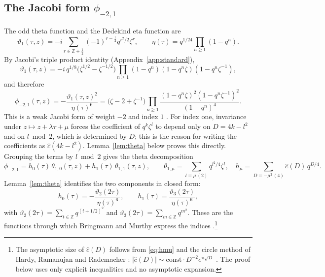 \documentclass[11pt]{amsart}
\theoremstyle{definition}
\newcommand{\ZZ}{\mathbb{Z}}
\newcommand{\cc}{\hat c}
\newcommand{\vt}{\vartheta}
\begin{document}
\subsection{The Jacobi form $\phi_{-2,1}$}\label{ssec:jacobi}
The odd theta function and the Dedekind eta function are
\[
\vt_1(\tau,z)=-i\sum_{r\in\ZZ+\frac12}(-1)^{r-\frac12}q^{r^2/2}\zeta^r,\qquad \eta(\tau)=q^{1/24}\prod_{n\ge1}(1-q^n).
\]
By Jacobi's triple product identity (Appendix~\ref{app:standard}),
\begin{equation}\label{eq:triple}
\vt_1(\tau,z)=-i\,q^{1/8}\bigl(\zeta^{1/2}-\zeta^{-1/2}\bigr)\prod_{n\ge1}(1-q^n)(1-q^n\zeta)(1-q^n\zeta^{-1}),
\end{equation}
and therefore
\begin{equation}\label{eq:product}
\phi_{-2,1}(\tau,z)=-\frac{\vt_1(\tau,z)^2}{\eta(\tau)^6}=\bigl(\zeta-2+\zeta^{-1}\bigr)\prod_{n\ge1}\frac{(1-q^n\zeta)^2(1-q^n\zeta^{-1})^2}{(1-q^n)^4}.
\end{equation}
This is a weak Jacobi form of weight $-2$ and index $1$ \cite[Thm.~9.3]{EZ85}. For index one, invariance under $z\mapsto z+\lambda\tau+\mu$ forces the coefficient of $q^k\zeta^l$ to depend only on $D=4k-l^2$ and on $l\bmod 2$, which is determined by $D$; this is the reason for writing the coefficients as $\cc(4k-l^2)$. Lemma~\ref{lem:theta} below proves this directly. Grouping the terms by $l\bmod2$ gives the theta decomposition
\[
\phi_{-2,1}=h_0(\tau)\,\theta_{1,0}(\tau,z)+h_1(\tau)\,\theta_{1,1}(\tau,z),\qquad \theta_{1,\mu}=\sum_{l\equiv\mu\,(2)}q^{l^2/4}\zeta^l,\quad h_\mu=\sum_{D\equiv-\mu^2\,(4)}\cc(D)\,q^{D/4}.
\]
Lemma~\ref{lem:theta} identifies the two components in closed form:
\begin{equation}\label{eq:hmu}
h_0(\tau)=-\frac{\vt_2(2\tau)}{\eta(\tau)^6},\qquad h_1(\tau)=\frac{\vt_3(2\tau)}{\eta(\tau)^6},
\end{equation}
with $\vt_2(2\tau)=\sum_{t\in\ZZ}q^{(t+1/2)^2}$ and $\vt_3(2\tau)=\sum_{m\in\ZZ}q^{m^2}$. These are the functions through which Bringmann and Murthy express the indices \cite{BM13}.\footnote{The asymptotic size of $\cc(D)$ follows from \eqref{eq:hmu} and the circle method of Hardy, Ramanujan and Rademacher \cite{HR18,Rad43,Rad73}: $|\cc(D)|\sim\text{const}\cdot D^{-2}e^{\pi\sqrt D}$ \cite[(5.45)]{DGMS11}. The proof below uses only explicit inequalities and no asymptotic expansion.}
\end{document}
